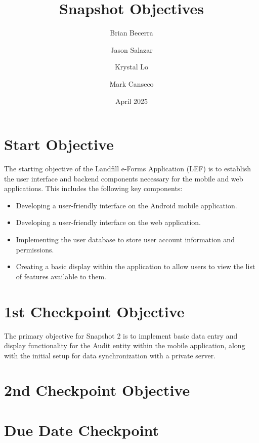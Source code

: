 \documentclass[12pt]{article}
\title{Snapshot Objectives}
\author{
    Brian Becerra\\
    \and
    Jason Salazar\\
    \and
    Krystal Lo\\
    \and
    Mark Canseco\\
    }
\date{April 2025}
\begin{document}
\begin{titlepage}
\maketitle
\thispagestyle{empty}
\end{titlepage}

\section*{Start Objective}
The starting objective of the Landfill e-Forms Application (LEF) is to establish the user interface and backend components necessary for the mobile and web applications. This includes the following key components:\\
\begin{itemize}
    \item Developing a user-friendly interface on the Android mobile application.
    \item  Developing a user-friendly interface on the web application.
    \item Implementing the user database to store user account information and permissions.
    \item Creating a basic display within the application to allow users to view the list of features available to them.
\end{itemize}

\section*{1st Checkpoint Objective}

The primary objective for Snapshot 2 is to implement basic data entry and display functionality for the Audit entity within the mobile application, along with the initial setup for data synchronization with a private server.

\section*{2nd Checkpoint Objective}

\section*{Due Date Checkpoint}
\end{document}
